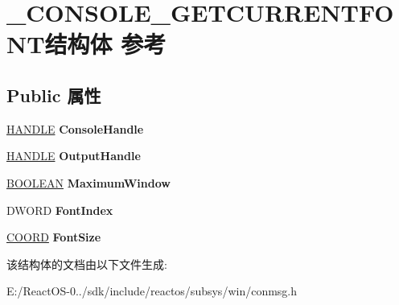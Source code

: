 \hypertarget{struct___c_o_n_s_o_l_e___g_e_t_c_u_r_r_e_n_t_f_o_n_t}{}\section{\+\_\+\+C\+O\+N\+S\+O\+L\+E\+\_\+\+G\+E\+T\+C\+U\+R\+R\+E\+N\+T\+F\+O\+N\+T结构体 参考}
\label{struct___c_o_n_s_o_l_e___g_e_t_c_u_r_r_e_n_t_f_o_n_t}
\subsection*{Public 属性}
\begin{DoxyCompactItemize}
\item 
\mbox{\label{struct___c_o_n_s_o_l_e___g_e_t_c_u_r_r_e_n_t_f_o_n_t_a685c4f25ae48e4458afbb05e2e44222d}} 
\hyperlink{interfacevoid}{H\+A\+N\+D\+LE} {\bfseries Console\+Handle}
\item 
\mbox{\label{struct___c_o_n_s_o_l_e___g_e_t_c_u_r_r_e_n_t_f_o_n_t_aca277cbd965207635474a2106f3c9346}} 
\hyperlink{interfacevoid}{H\+A\+N\+D\+LE} {\bfseries Output\+Handle}
\item 
\mbox{\label{struct___c_o_n_s_o_l_e___g_e_t_c_u_r_r_e_n_t_f_o_n_t_a12469dd8b87074fb3b94b46d15bf191e}} 
\hyperlink{_processor_bind_8h_a112e3146cb38b6ee95e64d85842e380a}{B\+O\+O\+L\+E\+AN} {\bfseries Maximum\+Window}
\item 
\mbox{\label{struct___c_o_n_s_o_l_e___g_e_t_c_u_r_r_e_n_t_f_o_n_t_a9050c48563527c093643b36085658e56}} 
D\+W\+O\+RD {\bfseries Font\+Index}
\item 
\mbox{\label{struct___c_o_n_s_o_l_e___g_e_t_c_u_r_r_e_n_t_f_o_n_t_a1cc9bbbda0e0337b84be5248a6482d20}} 
\hyperlink{struct___c_o_o_r_d}{C\+O\+O\+RD} {\bfseries Font\+Size}
\end{DoxyCompactItemize}


该结构体的文档由以下文件生成\+:\begin{DoxyCompactItemize}
\item 
E\+:/\+React\+O\+S-\/0../sdk/include/reactos/subsys/win/conmsg.\+h\end{DoxyCompactItemize}
